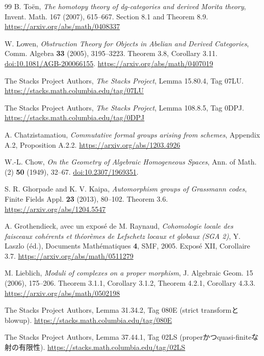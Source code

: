 \documentclass[a4paper,11pt]{ltjsarticle}
\theoremstyle{definition}
\begin{document}
\begin{thebibliography}{99}
B. To\"en,
\emph{The homotopy theory of dg-categories and derived Morita theory},
Invent. Math. 167 (2007), 615--667.
Section 8.1 and Theorem 8.9.
\url{https://arxiv.org/abs/math/0408337}

W. Lowen,
\emph{Obstruction Theory for Objects in Abelian and Derived Categories},
Comm. Algebra \textbf{33} (2005), 3195--3223.
Theorem 3.8, Corollary 3.11.
\href{https://doi.org/10.1081/AGB-200066155}{doi:10.1081/AGB-200066155}.
\url{https://arxiv.org/abs/math/0407019}

The Stacks Project Authors,
\emph{The Stacks Project}, Lemma 15.80.4, Tag 07LU.
\url{https://stacks.math.columbia.edu/tag/07LU}

The Stacks Project Authors,
\emph{The Stacks Project}, Lemma 108.8.5, Tag 0DPJ.
\url{https://stacks.math.columbia.edu/tag/0DPJ}

A. Chatzistamatiou,
\emph{Commutative formal groups arising from schemes},
Appendix A.2, Proposition A.2.2.
\url{https://arxiv.org/abs/1203.4926}

W.-L. Chow,
\emph{On the Geometry of Algebraic Homogeneous Spaces},
Ann. of Math. (2) \textbf{50} (1949), 32--67.
\href{https://doi.org/10.2307/1969351}{doi:10.2307/1969351}.

S. R. Ghorpade and K. V. Kaipa,
\emph{Automorphism groups of Grassmann codes},
Finite Fields Appl. \textbf{23} (2013), 80--102.
Theorem 3.6.
\url{https://arxiv.org/abs/1204.5547}

A. Grothendieck, avec un expos\'e de M. Raynaud,
\emph{Cohomologie locale des faisceaux coh\'erents et th\'eor\`emes de Lefschetz
locaux et globaux (SGA 2)},
Y. Laszlo (\'ed.), Documents Math\'ematiques \textbf{4}, SMF, 2005.
Expos\'e XII, Corollaire 3.7.
\url{https://arxiv.org/abs/math/0511279}


M. Lieblich,
\emph{Moduli of complexes on a proper morphism},
J. Algebraic Geom. 15 (2006), 175--206.
Theorem 3.1.1, Corollary 3.1.2, Theorem 4.2.1, Corollary 4.3.3.
\url{https://arxiv.org/abs/math/0502198}

The Stacks Project Authors,
Lemma 31.34.2, Tag 080E (strict transformとblowup).
\url{https://stacks.math.columbia.edu/tag/080E}

The Stacks Project Authors,
Lemma 37.44.1, Tag 02LS (properかつquasi-finiteな射の有限性).
\url{https://stacks.math.columbia.edu/tag/02LS}


\end{thebibliography}
\end{document}
